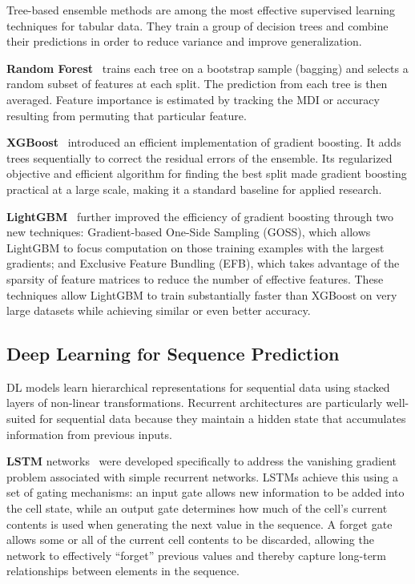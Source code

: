 Tree-based ensemble methods are among the most effective supervised learning techniques for tabular data. They train a group of decision trees and combine their predictions in order to reduce variance and improve generalization.

\textbf{Random Forest}~\cite{breiman2001random} trains each tree on a bootstrap sample (bagging) and selects a random subset of features at each split. The prediction from each tree is then averaged. Feature importance is estimated by tracking the MDI or accuracy resulting from permuting that particular feature.

\textbf{XGBoost}~\cite{chen2016xgboost} introduced an efficient implementation of gradient boosting. It adds trees sequentially to correct the residual errors of the ensemble. Its regularized objective and efficient algorithm for finding the best split made gradient boosting practical at a large scale, making it a standard baseline for applied research.

\textbf{LightGBM}~\cite{ke2017lightgbm} further improved the efficiency of gradient boosting through two new techniques: Gradient-based One-Side Sampling (GOSS), which allows LightGBM to focus computation on those training examples with the largest gradients; and Exclusive Feature Bundling (EFB), which takes advantage of the sparsity of feature matrices to reduce the number of effective features. These techniques allow LightGBM to train substantially faster than XGBoost on very large datasets while achieving similar or even better accuracy.

\newpage
\subsection{Deep Learning for Sequence Prediction}

DL models learn hierarchical representations for sequential data using stacked layers of non-linear transformations. Recurrent architectures are particularly well-suited for sequential data because they maintain a hidden state that accumulates information from previous inputs.

\textbf{LSTM} networks~\cite{hochreiter1997long} were developed specifically to address the vanishing gradient problem associated with simple recurrent networks. LSTMs achieve this using a set of gating mechanisms: an input gate allows new information to be added into the cell state, while an output gate determines how much of the cell's current contents is used when generating the next value in the sequence. A forget gate allows some or all of the current cell contents to be discarded, allowing the network to effectively ``forget'' previous values and thereby capture long-term relationships between elements in the sequence.

